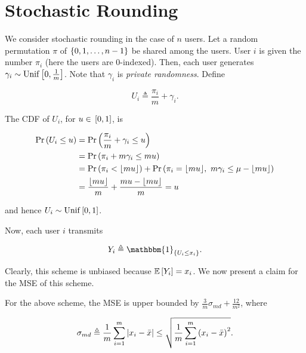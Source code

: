 \documentclass[twoside]{article}
\begin{document}



\section{Stochastic Rounding}

We consider stochastic rounding in the case of \(n\) users. Let a random 
permutation \(\pi\) of \(\left\{0,1,\ldots,n-1\right\}\) be shared among the users.
User \(i\) is given the number \(\pi_i\) (here the users are 0-indexed). Then,
each user generates \(\gamma_i \sim \mathrm{Unif}{}\left[0,\frac{1}{m}\right]\).
Note that \(\gamma_i\) is \emph{private randomness}. Define

\begin{equation}
    U_i \triangleq \frac{\pi_i}{m} + \gamma_i.
    \label{eq:Ui-def}
\end{equation}

The CDF of \(U_i\), for \(u \in {}\left[0,1\right]\), is

\begin{align}
    \Pr\left(U_i\le u\right) &= \Pr\left(\frac{\pi_i}{m}+ \gamma_i \le u\right) \\
                  &= \Pr\left(\pi_i + m\gamma_i \le mu\right) \\
                  &= \Pr\left(\pi_i < \lfloor mu\rfloor\right) + \Pr\left(\pi_i = \lfloor mu\rfloor,\ m\gamma_i \le \mu - \lfloor mu\rfloor\right) \\
                  &= \frac{\lfloor mu\rfloor}{m} + \frac{mu-\lfloor mu\rfloor}{m} = u
                  \label{eq:ui-cdf}
\end{align}

and hence \(U_i \sim \mathrm{Unif}{}\left[0,1\right]\).

Now, each user \(i\) transmits

\begin{equation}
    Y_i \triangleq \mathbbm{1}_{\cbrak{U_i\le x_i}}.
    \label{eq:Yi-def}
\end{equation}

Clearly, this scheme is unbiased because \(\mathbb{E}\left[ Y_i \right] = x_i\). We now present
a claim for the MSE of this scheme.

\begin{claim}
    For the above scheme, the MSE is upper bounded by \(\frac{3}{m}\sigma_{md} + \frac{12}{m^2}\), where

    \begin{equation}
        \sigma_{md} \triangleq \frac{1}{m}\sum_{i=1}^m\left\vert x_i-\bar{x}\right\vert \le \sqrt{\frac{1}{m}\sum_{i=1}^m\left(x_i-\bar{x}\right)^2}.
        \label{eq:sigma-md-def}
    \end{equation}
\end{claim}
\end{document}
